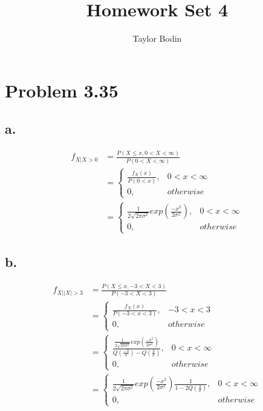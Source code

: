 \documentclass[12pt]{article}
\begin{document}
\title{Homework Set 4}
\author{Taylor Bodin}
\maketitle

\section*{Problem 3.35} %
\subsection*{a.} %
\begin{align*}
  f_{X|X>0} &= \frac{P(X \leq x, 0<X<\infty)}{P(0<X<\infty)} \\
  &= \begin{cases} 
        \frac{f_X(x)}{P(0<x)}, & 0 < x < \infty \\
        0, & otherwise 
     \end{cases} \\
  &= \begin{cases} 
        \frac{1}{2\sqrt{2\pi\sigma^2}}exp(\frac{-x^2}{2\sigma^2}), & 0 < x < \infty \\
        0, & otherwise 
      \end{cases}
\end{align*}

\subsection*{b.} %
\begin{align*}
  f_{X||X|>3} &= \frac{P(X \leq x, -3<X<3)}{P(-3<X<3)} \\
  &= \begin{cases} 
    \frac{f_X(x)}{P(-3<x<3)}, & -3 < x < 3 \\
    0, & otherwise 
  \end{cases} \\
  &= \begin{cases} 
    \frac{\frac{1}{2\sqrt{2\pi\sigma^2}}exp(\frac{-x^2}{2\sigma^2})}
    {Q(\frac{-3}{\sigma}) - Q(\frac{3}{\sigma})}, & 0 < x < \infty \\
    0, & otherwise 
  \end{cases} \\
  &= \begin{cases} 
    \frac{1}{2\sqrt{2\pi\sigma^2}}exp(\frac{-x^2}{2\sigma^2})
    \frac{1}{1 - 2Q(\frac{3}{\sigma})}, & 0 < x < \infty \\
    0, & otherwise 
  \end{cases}
\end{align*}
\end{document}
